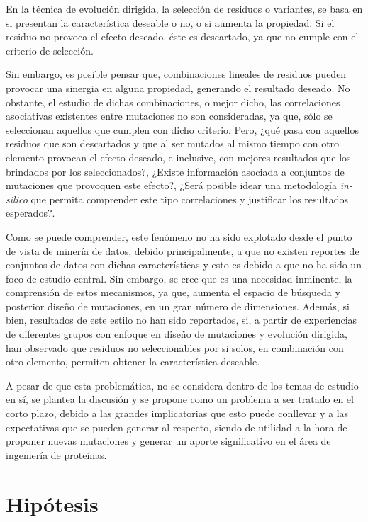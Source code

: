 En la técnica de evolución dirigida, la selección de residuos o variantes, se basa en si presentan la característica deseable o no, o si aumenta la propiedad. Si el residuo no provoca el efecto deseado, éste es descartado, ya que no cumple con el criterio de selección.

Sin embargo, es posible pensar que, combinaciones lineales de residuos pueden provocar una sinergia en alguna propiedad, generando el resultado deseado. No obstante, el estudio de dichas combinaciones, o mejor dicho, las correlaciones asociativas existentes entre mutaciones no son consideradas, ya que, sólo se seleccionan aquellos que cumplen con dicho criterio. Pero, ¿qué pasa con aquellos residuos que son descartados y que al ser mutados al mismo tiempo con otro elemento provocan el efecto deseado, e inclusive, con mejores resultados que los brindados por los seleccionados?, ¿Existe información asociada a conjuntos de mutaciones que provoquen este efecto?, ¿Será posible idear una metodología \textit{in-silico} que permita comprender este tipo correlaciones y justificar los resultados esperados?.

Como se puede comprender, este fenómeno no ha sido explotado desde el punto de vista de minería de datos, debido principalmente, a que no existen reportes de conjuntos de datos con dichas características y esto es debido a que no ha sido un foco de estudio central. Sin embargo, se cree que es una necesidad inminente, la comprensión de estos mecanismos, ya que, aumenta el espacio de búsqueda y posterior diseño de mutaciones, en un gran número de dimensiones. Además, si bien, resultados de este estilo no han sido reportados, si, a partir de experiencias de diferentes grupos con enfoque en diseño de mutaciones y evolución dirigida, han observado que residuos no seleccionables por si solos, en combinación con otro elemento, permiten obtener la característica deseable.

A pesar de que esta problemática, no se considera dentro de los temas de estudio en sí, se plantea la discusión y se propone como un problema a ser tratado en el corto plazo, debido a las grandes implicatorias que esto puede conllevar y a las expectativas que se pueden generar al respecto, siendo de utilidad a la hora de proponer nuevas mutaciones y generar un aporte significativo en el área de ingeniería de proteínas.
 
\section{Hipótesis}

